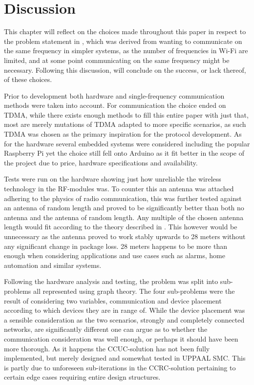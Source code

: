 \chapter{Discussion}\label{Discussion}
This chapter will reflect on the choices made throughout this paper in respect to the problem statement in , which was derived from wanting to communicate on the same frequency in simpler systems, as the number of frequencies in Wi-Fi are limited, and at some point communicating on the same frequency might be necessary.
Following this discussion,  will conclude on the success, or lack thereof, of these choices.

\bigskip \noindent
Prior to development both hardware and single-frequency communication methods were taken into account.
For communication the choice ended on TDMA, while there exists enough methods to fill this entire paper with just that, most are merely mutations of TDMA adapted to more specific scenarios, as such TDMA was chosen as the primary inspiration for the protocol development.
As for the hardware several embedded systems were considered including the popular Raspberry Pi yet the choice still fell onto Arduino as it fit better in the scope of the project due to price, hardware specifications and availability.

Tests were run on the hardware showing just how unreliable the wireless technology in the RF-modules was.
To counter this an antenna was attached adhering to the physics of radio communication, this was further tested against an antenna of random length and proved to be significantly better than both no antenna and the antenna of random length.
Any multiple of the chosen antenna length would fit according to the theory described in .
This however would be unnecessary as the antenna proved to work stably upwards to 28 meters without any significant change in package loss.
28 meters happens to be more than enough when considering applications and use cases such as alarms, home automation and similar systems.

\bigskip \noindent
Following the hardware analysis and testing, the problem was split into sub-problems all represented using graph theory.
The four sub-problems were the result of considering two variables, communication and device placement according to which devices they are in range of.
While the device placement was a sensible consideration as the two scenarios, strongly and completely connected networks, are significantly different one can argue as to whether the communication consideration was well enough, or perhaps it should have been more thorough.
As it happens the CCUC-solution has not been fully implemented, but merely designed and somewhat tested in UPPAAL SMC.
This is partly due to unforeseen sub-iterations in the CCRC-solution pertaining to certain edge cases requiring entire design structures.

